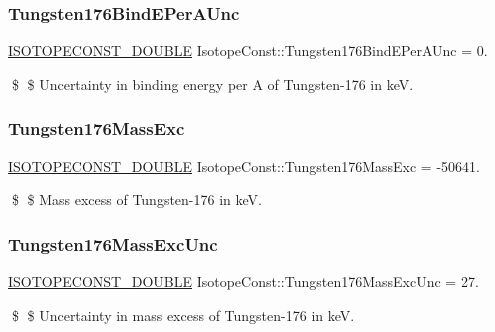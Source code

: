 \subsubsection{\texorpdfstring{Tungsten176\+Bind\+E\+Per\+A\+Unc}{Tungsten176BindEPerAUnc}}
{\footnotesize\ttfamily \mbox{\hyperlink{group___isotope_const-_macros_ga8f45a7272ce02c0b4c65c44636ed719a}{I\+S\+O\+T\+O\+P\+E\+C\+O\+N\+S\+T\+\_\+\+D\+O\+U\+B\+LE}} Isotope\+Const\+::\+Tungsten176\+Bind\+E\+Per\+A\+Unc = 0.}

\$ \$ Uncertainty in binding energy per A of Tungsten-\/176 in keV. \mbox{\label{group___isotope_const-_tungsten-_w176_gabb6ebb12d28a752f0ddbb4528c98a87e}} 
\subsubsection{\texorpdfstring{Tungsten176\+Mass\+Exc}{Tungsten176MassExc}}
{\footnotesize\ttfamily \mbox{\hyperlink{group___isotope_const-_macros_ga8f45a7272ce02c0b4c65c44636ed719a}{I\+S\+O\+T\+O\+P\+E\+C\+O\+N\+S\+T\+\_\+\+D\+O\+U\+B\+LE}} Isotope\+Const\+::\+Tungsten176\+Mass\+Exc = -\/50641.}

\$ \$ Mass excess of Tungsten-\/176 in keV. \mbox{\label{group___isotope_const-_tungsten-_w176_ga5eafd2735b9848ce3e1f38fc7580e06f}} 
\subsubsection{\texorpdfstring{Tungsten176\+Mass\+Exc\+Unc}{Tungsten176MassExcUnc}}
{\footnotesize\ttfamily \mbox{\hyperlink{group___isotope_const-_macros_ga8f45a7272ce02c0b4c65c44636ed719a}{I\+S\+O\+T\+O\+P\+E\+C\+O\+N\+S\+T\+\_\+\+D\+O\+U\+B\+LE}} Isotope\+Const\+::\+Tungsten176\+Mass\+Exc\+Unc = 27.}

\$ \$ Uncertainty in mass excess of Tungsten-\/176 in keV. \mbox{\label{group___isotope_const-_tungsten-_w176_ga1d46f03cbdd941505e7c27c7b9511935}} 
